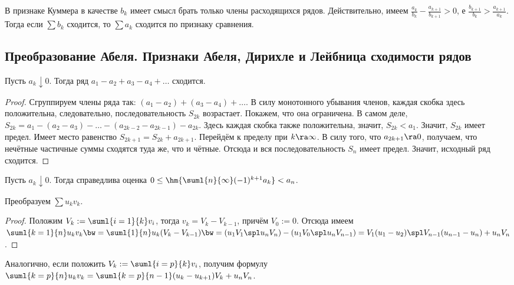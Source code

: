 \documentclass[a4paper]{article}
\begin{document}
\begin{note}
В признаке Куммера в качестве $b_k$ имеет смысл брать только члены расходящихся рядов. Действительно, имеем
$\frac{a_k}{b_k}-\frac{a_{k+1}}{b_{k+1}} > 0$, е $\frac{b_{k+1}}{b_k}>\frac{a_{k+1}}{a_k}$. Тогда если $\sum b_k$ сходится, то
$\sum a_k$ сходится по признаку сравнения.
\end{note}

\subsection{Преобразование Абеля. Признаки Абеля, Дирихле и Лейбница сходимости рядов}

\begin{theorem}
Пусть $a_k \downarrow 0$. Тогда ряд $a_1-a_2+a_3-a_4+\dots$ сходится.
\end{theorem}
\begin{proof}
Сгруппируем члены ряда так: $(a_1-a_2)+(a_3-a_4)+\dots$. В силу монотонного убывания членов, каждая скобка здесь положительна,
следовательно, последовательность $S_{2k}$ возрастает. Покажем, что она ограничена. В самом деле,
$S_{2k}=a_1-(a_2-a_3)-\dots-(a_{2k-2}-a_{2k-1})-a_{2k}$. Здесь каждая скобка также положительна, значит, $S_{2k} < a_1$.
Значит, $S_{2k}$ имеет предел. Имеет место равенство $S_{2k+1}=S_{2k} + a_{2k+1}$. Перейдём к пределу при $k \ra \infty$. В силу
того, что $a_{2k+1} \ra 0$, получаем, что нечётные частичные суммы сходятся
туда же, что и чётные. Отсюда и вся последовательность $S_n$ имеет предел. Значит, исходный ряд сходится.
\end{proof}

\begin{imp}
Пусть $a_k \downarrow 0$. Тогда справедлива оценка $0 \le \hm{\suml{n}{\infty} (-1)^{k+1}a_k} < a_n$.
\end{imp}

\begin{theorem}
Преобразуем $\sum u_kv_k$.
\end{theorem}
\begin{proof}
Положим $V_k := \suml{i=1}{k} v_i$, тогда $v_k= V_k-V_{k-1}$, причём $V_0:=0$.
Отсюда имеем $\suml{k=1}{n}u_k v_k\bw=\suml{1}{n}u_k(V_k-V_{k-1})\bw=(u_1V_1\spl u_nV_n)-(u_1V_0\spl u_nV_{n-1})=
V_1(u_1-u_2)\spl V_{n-1}(u_{n-1}-u_n) + u_nV_n$.
\end{proof}

\begin{note}
Аналогично, если положить $V_k:=\suml{i=p}{k}v_i$, получим формулу $\suml{k=p}{n}u_k v_k=\suml{k=p}{n-1}(u_k-u_{k+1})V_k + u_nV_n$.
\end{note}
\end{document}
